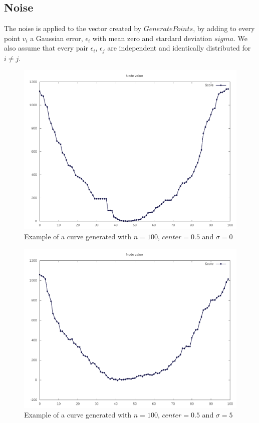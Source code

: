 \documentclass[12pt]{article}
\begin{document}
\subsection{Noise}
The noise is applied to the vector created by $GeneratePoints$, by adding to every point $v_i$ a Gaussian error, $\epsilon_i$ with mean zero and stardard deviation $sigma$. We also assume that every pair $\epsilon_i$, $\epsilon_j$  are independent and identically distributed for $i \neq j$.

\begin{figure}[H]
\caption{Example of a curve generated with $n = 100$, $center = 0.5$ and $\sigma = 0$}
\centering
\includegraphics[scale=.5]{curve_sigma0}
\end{figure}

\begin{figure}[H]
\caption{Example of a curve generated with $n = 100$, $center = 0.5$ and $\sigma = 5$}
\centering
\includegraphics[scale=.5]{curve_sigma5}
\end{figure}
\end{document}
